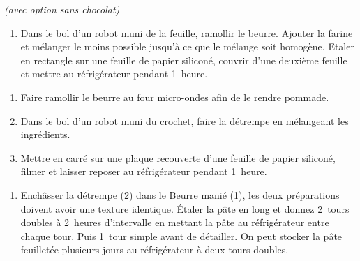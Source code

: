 
\centerline{\footnotesize\it{(avec option sans chocolat)}}


\begin{ingredients}
\end{ingredients}


\begin{recipe}
  \begin{enumerate}

  \item Dans le bol d’un robot muni de la feuille, ramollir le
    beurre.  Ajouter la farine et mélanger le moins possible jusqu’à ce
    que le mélange soit homogène. Etaler en rectangle sur une feuille
    de papier siliconé, couvrir d’une deuxième feuille et mettre au
    réfrigérateur pendant 1~heure.

  \end{enumerate}
\end{recipe}



\begin{ingredients}
\end{ingredients}


\begin{recipe}
  \begin{enumerate}

  \item Faire ramollir le beurre au four micro-ondes afin de le rendre
    pommade.

  \item Dans le bol d’un robot muni du crochet, faire la détrempe en
    mélangeant les ingrédients.

  \item Mettre en carré sur une plaque recouverte d’une feuille de
    papier siliconé, filmer et laisser reposer au réfrigérateur
    pendant 1~heure.

  \end{enumerate}
\end{recipe}



\begin{recipe}
  \begin{enumerate}

  \item Enchâsser la détrempe (2) dans le Beurre manié (1), les deux
    préparations doivent avoir une texture identique. Étaler la pâte
    en long et donnez 2~tours doubles à 2~heures d'intervalle en
    mettant la pâte au réfrigérateur entre chaque tour. Puis 1~tour
    simple avant de détailler. On peut stocker la pâte feuilletée
    plusieurs jours au réfrigérateur à deux tours doubles.

  \end{enumerate}
\end{recipe}


